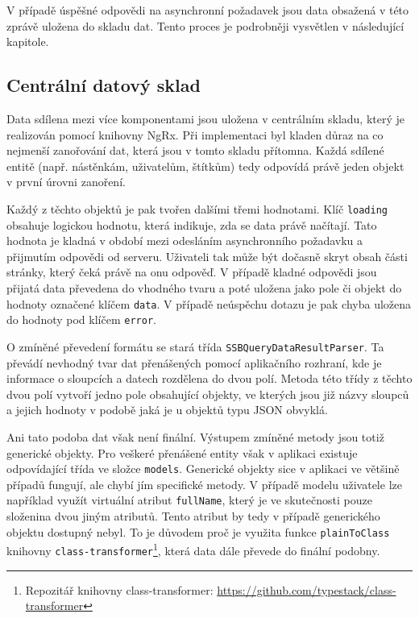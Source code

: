 V případě úspěšné odpovědi na asynchronní požadavek jsou data obsažená v této zprávě uložena do skladu dat. Tento proces je podrobněji vysvětlen v následující kapitole.


\subsection{Centrální datový sklad}
Data sdílena mezi více komponentami jsou uložena v centrálním skladu, který je realizován pomocí knihovny NgRx. Při implementaci byl kladen důraz na co nejmenší zanořování dat, která jsou v tomto skladu přítomna. Každá sdílené entitě (např. nástěnkám, uživatelům, štítkům) tedy odpovídá právě jeden objekt v první úrovni zanoření.

Každý z těchto objektů je pak tvořen dalšími třemi hodnotami. Klíč \texttt{loading} obsahuje logickou hodnotu, která indikuje, zda se data právě načítají. Tato hodnota je kladná v období mezi odesláním asynchronního požadavku a přijmutím odpovědi od serveru. Uživateli tak může být dočasně skryt obsah části stránky, který čeká právě na onu odpověď. V případě kladné odpovědi jsou přijatá data převedena do vhodného tvaru a poté uložena jako pole či objekt do hodnoty označené klíčem \texttt{data}. V případě neúspěchu dotazu je pak chyba uložena do hodnoty pod klíčem \texttt{error}.

O zmíněné převedení formátu se stará třída \texttt{SSBQueryDataResultParser}. Ta převádí nevhodný tvar dat přenášených pomocí aplikačního rozhraní, kde je informace o sloupcích a datech rozdělena do dvou polí. Metoda této třídy z těchto dvou polí vytvoří jedno pole obsahující objekty, ve kterých jsou již názvy sloupců a jejich hodnoty v podobě jaká je u objektů typu JSON obvyklá.

Ani tato podoba dat však není finální. Výstupem zmíněné metody jsou totiž generické objekty. Pro veškeré přenášené entity však v aplikaci existuje odpovídající třída ve složce \texttt{models}. Generické objekty sice v aplikaci ve většině případů fungují, ale chybí jím specifické metody. V případě modelu uživatele lze například využít virtuální atribut \texttt{fullName}, který je ve skutečnosti pouze složenina dvou jiným atributů. Tento atribut by tedy v případě generického objektu dostupný nebyl. 
To je důvodem proč je využita funkce \texttt{plainToClass} knihovny \texttt{class-transformer}\footnote{Repozitář knihovny class-transformer: \url{https://github.com/typestack/class-transformer}}, která data dále převede do finální podobny.

